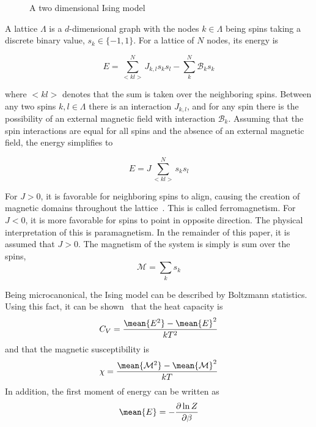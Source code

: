 \documentclass[aps,reprint]{revtex4-1}
\begin{document}
\begin{figure}[H]
  \centering
  \caption{A two dimensional Ising model}
  \label{fig:22lattice}
\end{figure}
A lattice \(\Lambda\) is a \(d\)-dimensional graph with the nodes \(k\in\Lambda\) being spins
taking a discrete binary value, \(s_{k}\in\{-1, 1\}\). For a lattice of \(N\)
nodes, its energy is

\begin{equation}
  \label{eq:2}
 E = \sum_{<kl>}^{N}J_{k,l}s_{k}s_{l} - \sum_{k}^{N}\mathcal{B}_{k}s_{k}
\end{equation}

where \(<kl>\) denotes that the sum is taken over the neighboring spins.
Between any two spins \(k, l \in \Lambda\) there is an interaction \(J_{k,l}\),
and for any spin there is the possibility of an external magnetic field with
interaction \(\mathcal{B}_{k}\). Assuming that the spin interactions are equal
for all spins and the absence of an external magnetic field, the energy
simplifies to

\begin{equation}
  \label{eq:3}
  E = J\sum_{<kl>}^{N}s_{k}s_{l}
\end{equation}

For \(J>0\), it is favorable for neighboring spins to align, causing the
creation of magnetic domains throughout the lattice~\cite{physicslectures}.
This is called ferromagnetism. For \(J<0\), it is more favorable for spins to
point in opposite direction. The physical interpretation of this is
paramagnetism. In the remainder of this paper, it is assumed that \(J>0\).
The magnetism of the system is simply is sum over the spins,
\begin{equation}
  \label{eq:1}
  \mathcal{M} = \sum_{k} s_{k}
\end{equation}


Being microcanonical, the Ising model can be described by Boltzmann statistics.
Using this fact, it can be shown~\cite{physicslectures} that the heat capacity is
\begin{equation}
  \label{eq:4}
  C_V = \frac{\mean{E^2} - \mean{E}^2}{kT^2}
\end{equation}
and that the magnetic susceptibility is
\begin{equation}
  \label{eq:5}
  \chi = \frac{\mean{\mathcal{M}^2} - \mean{\mathcal{M}}^2}{kT}
\end{equation}
In addition, the first moment of energy can be written as
\begin{equation}
  \label{eq:6}
  \mean{E} = - \pdv{\ln{Z}}{\beta}
\end{equation}
\end{document}
